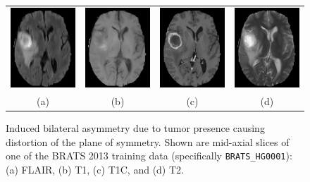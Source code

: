 \documentclass[preprint,authoryear,review,12pt]{elsarticle}
\begin{document}
\begin{figure}
  \centering
  \begin{tabular}{cccc}
  \includegraphics[width=30mm]{BRATS_HG0001/BRATS_HG0001_FLAIR_slice93.png} &
  \includegraphics[width=30mm]{BRATS_HG0001/BRATS_HG0001_T1_slice93.png} &
  \includegraphics[width=30mm]{BRATS_HG0001/BRATS_HG0001_T1C_slice93.png} &
  \includegraphics[width=30mm]{BRATS_HG0001/BRATS_HG0001_T2_slice93.png} \\
  (a) & (b) &
  (c) & (d) \\
  \end{tabular}
  \caption{Induced bilateral asymmetry due to tumor presence causing
  distortion of the plane of symmetry.  Shown are mid-axial slices of
  one of the BRATS 2013 training data 
  (specifically {\tt BRATS\_HG0001}):  (a) FLAIR, (b) T1, (c) T1C, and
  (d) T2.  }
  \label{fig:asymmetry}
\end{figure}
\end{document}
